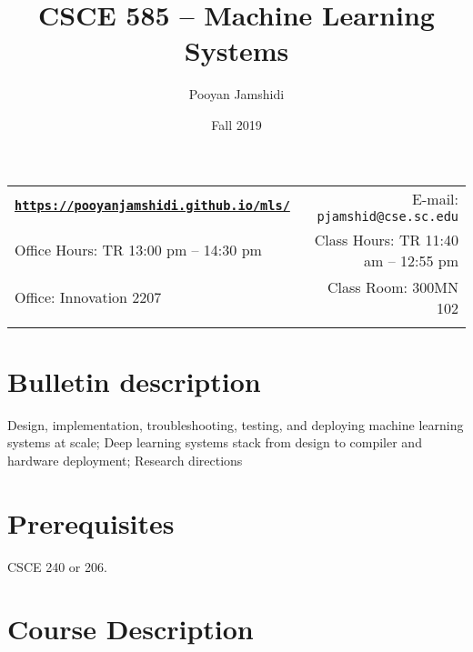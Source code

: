 \documentclass[11pt]{article}
\title{CSCE 585 -- Machine Learning Systems}
\author{Pooyan Jamshidi}
\date{Fall 2019}
\newcommand{\blankline}{\quad\pagebreak[2]}
\begin{document}
\maketitle

\blankline

\begin{tabular*}{.93\textwidth}{@{\extracolsep{\fill}}lr}


\href{https://pooyanjamshidi.github.io/mls/}{\tt\bf https://pooyanjamshidi.github.io/mls/}  & E-mail: \texttt{pjamshid@cse.sc.edu} \\

Office Hours: TR 13:00 pm -- 14:30 pm  &  Class Hours: TR 11:40 am -- 12:55 pm \\

Office: Innovation 2207 & Class Room: 300MN 102 \\
&  \\

\hline
\end{tabular*}

\vspace{10mm}

\section*{Bulletin description}
Design, implementation, troubleshooting, testing, and deploying machine learning systems at scale; Deep learning systems stack from design to compiler and hardware deployment; Research directions

\section*{Prerequisites}
CSCE 240 or 206.

\section*{Course Description}
\end{document}
